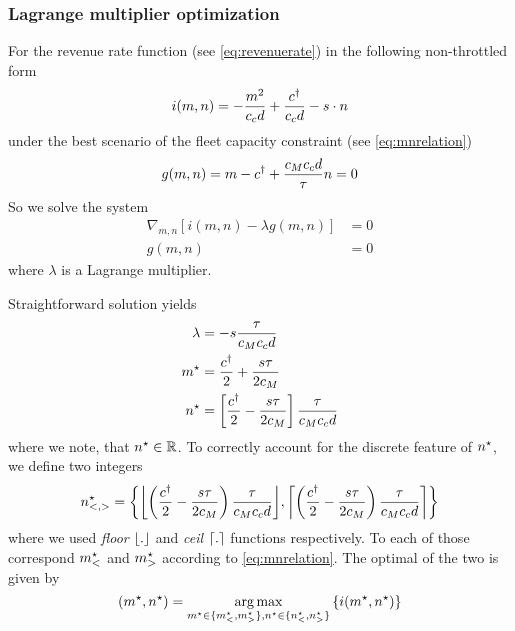 \documentclass[a4paper]{report}
\DeclarePairedDelimiter\floor{\lfloor}{\rfloor}
\DeclarePairedDelimiter\ceil{\lceil}{\rceil}
\DeclareMathOperator*{\argmax}{arg\,max}
\begin{document}
\subsubsection{Lagrange multiplier optimization}
For the revenue rate function (see \autoref{eq:revenuerate}) in the following non-throttled form
\begin{equation}
	i(m,n)=-\frac{m^2}{c_cd}+\frac{c^{\dagger}}{c_cd}-s\cdot n \label{eq:revenueratefree}
\end{equation}
under the best scenario of the fleet capacity constraint (see \autoref{eq:mnrelation})
\begin{equation}
	g(m,n)=m-c^{\dagger}+\frac{c_Mc_cd}{\tau} n=0 \label{eq:lagrangeconst}
\end{equation}
So we solve the system
\begin{align*}
	\nabla_{m,n} \left[i(m,n)-\lambda g(m,n)\right]&=0\\
	g(m,n)&=0
\end{align*}
where $\lambda$ is a Lagrange multiplier.

Straightforward solution yields
\begin{align*}
\lambda&= -s\frac{\tau}{c_Mc_cd}\\
m^{\star}&=\frac{c^{\dagger}}{2}+\frac{s\tau}{2c_M}\\
n^\star&=\left[\frac{c^{\dagger}}{2}-\frac{s\tau}{2c_M}\right]\frac{\tau}{c_Mc_cd}
\end{align*}
where we note, that $n^\star\in\mathbb{R}$. To correctly account for the discrete feature of $n^\star$, we define two integers
\def\nsd{\left(\frac{\cd}{2}-\frac{s\tau}{2c_M}\right)\frac{\tau}{c_Mc_cd}}
\begin{equation}
	n^\star_{<,>} = \left\{\floor*{\nsd}, \ceil*{\nsd}\right\}\label{eq:twons}
\end{equation}
where we used \emph{floor} $\floor*{.}$ and \emph{ceil} $\ceil*{.}$ functions respectively. To each of those correspond $m^{\star}_<$ and $m^{\star}_>$ according to \autoref{eq:mnrelation}. The optimal of the two is given by
\begin{equation*}
	(\ms,\ns)=\argmax\limits_{\ms\in\{\ms_<,\ms_>\},\ns\in\{\ns_<,\ns_>\}}\left\{i(\ms,\ns)\right\}
\end{equation*}
\end{document}
